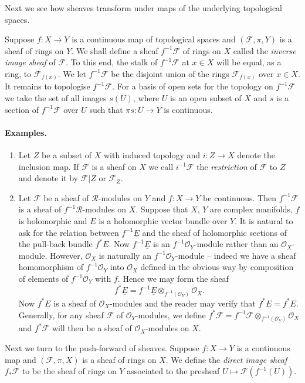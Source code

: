Next we see how sheaves transform under maps of the underlying topological spaces.

Suppose $f:X\to Y$ is a continuous map of topological spaces and $(\mathcal F,\pi,Y)$ is a sheaf of rings on $Y$. We shall define a sheaf $f^{-1}\mathcal F$ of rings on $X$ called the \emph{inverse image sheaf} of $\mathcal F$. To this end, the stalk of $f^{-1}\mathcal F$ at $x\in X$ will be equal, as a ring, to $\mathcal F_{f(x)}$. We let $f^{-1}\mathcal F$ be the disjoint union of the rings $\mathcal F_{f(x)}$ over $x\in X$. It remains to topologise $f^{-1}\mathcal F$. For a basis of open sets for the topology on $f^{-1}\mathcal F$ we take the set of all images $s(U)$, where $U$ is an open subset of $X$ and $s$ is a section of $f^{-1}\mathcal F$ over $U$ such that $\pi s:U\to Y$ is continuous.

\paragraph{Examples.}
\begin{enumerate}[start=31]
\item Let $Z$ be a subset of $X$ with induced topology and $i:Z\to X$ denote the inclusion map. If $\mathcal F$ is a sheaf on $X$ we call $i^{-1}\mathcal F$ the \emph{restriction} of $\mathcal F$ to $Z$ and denote it by $\mathcal F|Z$ or $\mathcal F_Z$.
\item Let $\mathcal F$ be a sheaf of $\mathcal R$-modules on $Y$ and $f:X\to Y$ be continuous. Then $f^{-1}\mathcal F$ is a sheaf of $f^{-1}\mathcal R$-modules on $X$. Suppose that $X$, $Y$ are complex manifolds, $f$ is holomorphic and $E$ is a holomorphic vector bundle over $Y$.
It is natural to ask for the relation between $f^{-1}\underline E$ and the sheaf of holomorphic sections of the pull-back bundle $f^*E$. Now $f^{-1}\underline E$ is an $f^{-1}\mathcal O_Y$-module rather than an $\mathcal O_X$-module. However, $\mathcal O_X$ is naturally an $f^{-1}\mathcal O_Y$-module -- indeed we have a sheaf homomorphism of $f^{-1}\mathcal O_Y$ into $\mathcal O_X$ defined in the obvious way by composition of elements of $f^{-1}\mathcal O_Y$ with $f$. Hence we may form the sheaf
\[
f^*\underline E=f^{-1}\underline E\otimes_{f^{-1}(\mathcal O_Y)}\mathcal O_X.
\]
Now $f^*\underline E$ is a sheaf of $\mathcal O_X$-modules and the reader may verify that $f^*\underline E=\underline{f^*E}$. Generally, for any sheaf $\mathcal F$ of $\mathcal O_Y$-modules, we define $f^*\mathcal F=f^{-1}\mathcal F\otimes_{f^{-1}(\mathcal O_Y)}\mathcal O_X$ and $f^*\mathcal F$ will then be a sheaf of $\mathcal O_X$-modules on $X$.
\end{enumerate}
Next we turn to the push-forward of sheaves. Suppose $f:X\to Y$ is a continuous map and $(\mathcal F,\pi,X)$ is a sheaf of rings on $X$. We define the \emph{direct image sheaf} $f_*\mathcal F$ to be the sheaf of rings on $Y$ associated to the presheaf $U\mapsto\mathcal F(f^{-1}(U))$.

